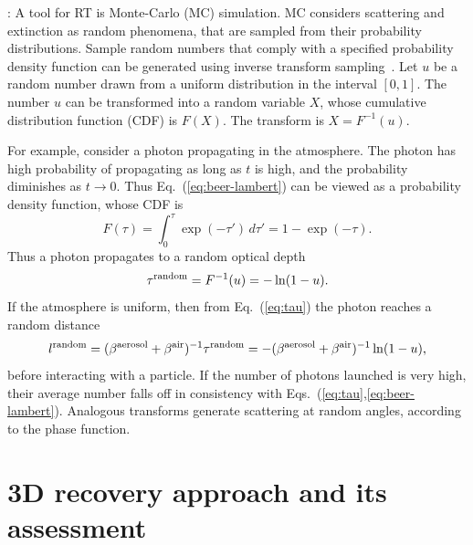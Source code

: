 \documentclass[10pt,letterpaper]{article}
\newcommand{\derivsym}[1]{\,d{#1}}
\begin{document}
: A tool for RT is
Monte-Carlo (MC) simulation. MC considers scattering and extinction as
random phenomena, that are sampled from their probability
distributions.  Sample random numbers that comply with a specified
probability density function can be generated using inverse transform
sampling~\cite{devroye1986sample}. Let $u$ be a random number drawn
from a uniform distribution in the interval $[0,1]$. The number $u$
can be transformed into a random variable $X$, whose cumulative
distribution function (CDF) is $F(X)$. The transform is $X =
F^{-1}(u)$.

For example, consider a photon propagating in the atmosphere.  The
photon has high probability of propagating as long as $t$ is high, and
the probability diminishes as $t\rightarrow 0$. Thus
Eq.~(\ref{eq:beer-lambert}) can be viewed as a probability density
function, whose CDF is
\begin{equation}
  \label{eq:Ftau}
  F(\tau)=\int_{0}^{\tau}\exp(-\tau')\derivsym{\tau'}=1-\exp(-\tau).
\end{equation}
Thus a photon propagates to a random optical depth
\begin{equation}
  \label{eq:taurand}
  \tau^{\rm random}=F^{-1}(u)=-\ln(1-u).
\end{equation}
If the atmosphere is uniform, then from Eq.~(\ref{eq:tau}) the photon
reaches a random distance
\begin{equation}
  \label{eq:lrand}
  l^{\rm random}= (\beta^{\rm aerosol}+\beta^{\rm air})^{-1} \tau^{\rm random}
  = -(\beta^{\rm aerosol}+\beta^{\rm air})^{-1}\ln(1-u),
\end{equation}
before interacting with a particle. If the number of photons launched
is very high, their average number falls off in consistency with
Eqs.~(\ref{eq:tau},\ref{eq:beer-lambert}).  Analogous transforms
generate scattering at random angles, according to the phase function.


\section{3D recovery approach and its assessment}
\label{sec:methodology}
\end{document}
